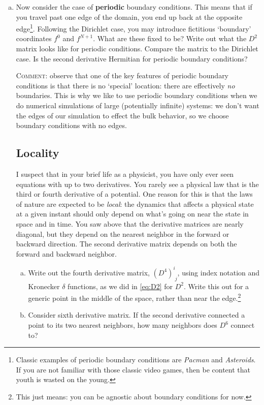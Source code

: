 \documentclass[12pt]{article}
\numberwithin{equation}{section}    %
\begin{document}
\begin{enumerate}[(a)]
\item Now consider the case of \textbf{periodic} boundary conditions. This means that if you travel past one edge of the domain, you end up back at the opposite edge\footnote{Classic examples of periodic boundary conditions are \emph{Pacman} and \emph{Asteroids}. If you are not familiar with those classic video games, then be content that youth is wasted on the young.}. Following the Dirichlet case, you may introduce fictitious `boundary' coordinates $f^0$ and $f^{N+1}$. What are these fixed to be? Write out what the $D^2$ matrix looks like for periodic conditions. Compare the matrix to the Dirichlet case. Is the second derivative Hermitian for periodic boundary conditions?

\textsc{Comment}: observe that one of the key features of periodic boundary conditions is that there is no `special' location: there are effectively \emph{no} boundaries. This is why we like to use periodic boundary conditions when we do numerical simulations of large (potentially infinite) systems: we don't want the edges of our simulation to effect the bulk behavior, so we choose boundary conditions with no edges.

\subsection{Locality}

I suspect that in your brief life as a physicist, you have only ever seen equations with up to two derivatives. You rarely see a physical law that is the third or fourth derivative of a potential. One reason for this is that the laws of nature are expected to be \emph{local}: the dynamics that affects a physical state at a given instant should only depend on what's going on near the state in space and in time. You saw above that the derivative matrices are nearly diagonal, but they depend on the nearest neighbor in the forward or backward direction. The second derivative matrix depends on both the forward and backward neighbor.

\begin{enumerate}[(a)]
\item Write out the fourth derivative matrix, $(D^4)^i_{\phantom{i}j}$, using index notation and Kronecker $\delta$ functions, as we did in \eqref{eq:D2} for $D^2$. Write this out for a generic point in the middle of the space, rather than near the edge.\footnote{This just means: you can be agnostic about boundary conditions for now.}
\item Consider sixth derivative matrix. If the second derivative connected a point to its two nearest neighbors, how many neighbors does $D^6$ connect to?
\end{enumerate}





\end{enumerate}
\end{document}
